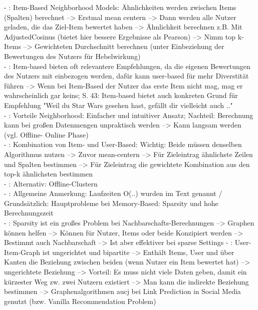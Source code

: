 - \cite[S. 40f.]{recommenderSystems:2016}: Item-Based Neighborhood Models: Ähnlichkeiten werden zwischen Items (Spalten) berechnet --> Erstmal mean centern --> Dann werden alle Nutzer geladen, die das Ziel-Item bewertet haben --> Ähnlichkeit berechnen z.B. Mit AdjustedCosinus (bietet hier bessere Ergebnisse als Pearson) --> Nimm top k-Items --> Gewichteten Durchschnitt berechnen (unter Einbeziehung der Bewertungen des Nutzers für Hebelwirkung)\\
- \cite[S. 42]{recommenderSystems:2016}: Item-based bieten oft relevantere Empfehlungen, da die eigenen Bewertungen des Nutzers mit einbezogen werden, dafür kann user-based für mehr Diverstität führen --> Wenn bei Item-Based der Nutzer das erste Item nicht mag, mag er wahrscheinlich gar keins; S. 43: Item-based bietet auch konkreten Grund für Empfehlung "Weil du Star Wars gesehen hast, gefällt dir vielleicht auch .."\\
- \cite[S. 44]{recommenderSystems:2016}: Vorteile Neighborhood: Einfacher und intuitiver Ansatz; Nachteil: Berechnung kann bei großen Datenmengen unpraktisch werden --> Kann langsam werden (vgl. Offline- Online Phase)\\
- \cite[S. 44]{recommenderSystems:2016}: Kombination von Item- und User-Based: Wichtig: Beide müssen denselben Algorithmus nutzen --> Zuvor mean-centern --> Für Zieleintrag ähnlichste Zeilen und Spalten bestimmen --> Für Zieleintrag die gewichtete Kombination aus den top-k ähnlichsten bestimmen\\
- \cite[S. 46]{recommenderSystems:2016}: Alternativ: Offline-Clustern\\
- \cite{recommenderSystems:2016}: Allgemeine Anmerkung: Laufzeiten O(..) wurden im Text genannt / Grundsätzlich: Hauptprobleme bei Memory-Based: Sparsity und hohe Berechnungszeit\\
- \cite[S. 60]{recommenderSystems:2016}: Sparsity ist ein großes Problem bei Nachbarschafts-Berechnungen  --> Graphen können helfen --> Können für Nutzer, Items oder beide Konzipiert werden --> Bestimmt auch Nachbarschaft --> Ist aber effektiver bei sparse Settings
- \cite[S. 61]{recommenderSystems:2016}: User-Item-Graph ist ungerichtet und bipartite --> Enthält Items, User und über Kanten die Beziehung zwischen beiden (wenn Nutzer ein Item bewertet hat) --> ungerichtete Beziehung --> Vorteil: Es muss nicht viele Daten geben, damit ein kürzester Weg zw. zwei Nutzern existiert --> Man kann die indirekte Beziehung bestimmen --> Graphenalgorithmen aucj bei Link Prediction in Social Media genutzt (bzw. Vanilla Recommendation Problem)\\

